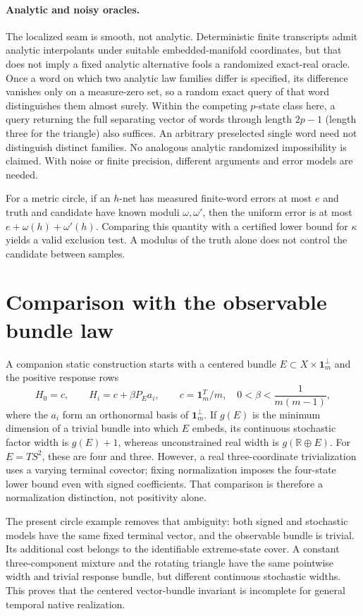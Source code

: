 \documentclass[11pt]{article}
\theoremstyle{definition}\newtheorem{definition}[theorem]{Definition}
\theoremstyle{remark}\newtheorem{remark}[theorem]{Remark}
\newcommand{\R}{\mathbb R}
\newcommand{\one}{\mathbf 1}
\begin{document}
\paragraph{Analytic and noisy oracles.}
The localized seam is smooth, not analytic. Deterministic finite transcripts admit analytic interpolants under suitable embedded-manifold coordinates, but that does not imply a fixed analytic alternative fools a randomized exact-real oracle. Once a word on which two analytic law families differ is specified, its difference vanishes only on a measure-zero set, so a random exact query of that word distinguishes them almost surely. Within the competing $p$-state class here, a query returning the full separating vector of words through length $2p-1$ (length three for the triangle) also suffices. An arbitrary preselected single word need not distinguish distinct families. No analogous analytic randomized impossibility is claimed. With noise or finite precision, different arguments and error models are needed.

For a metric circle, if an $h$-net has measured finite-word errors at most $e$ and truth and candidate have known moduli $\omega,\omega'$, then the uniform error is at most $e+\omega(h)+\omega'(h)$. Comparing this quantity with a certified lower bound for $\kappa$ yields a valid exclusion test. A modulus of the truth alone does not control the candidate between samples.

\section{Comparison with the observable bundle law}
A companion static construction starts with a centered bundle $E\subset X\times\one_m^\perp$ and the positive response rows
\[
 H_0=c,\qquad H_i=c+\beta P_Ea_i,\qquad
 c=\one_m^T/m,\quad 0<\beta<\frac1{m(m-1)},
\]
where the $a_i$ form an orthonormal basis of $\one_m^\perp$. If $g(E)$ is the minimum dimension of a trivial bundle into which $E$ embeds, its continuous stochastic factor width is $g(E)+1$, whereas unconstrained real width is $g(\R\oplus E)$. For $E=TS^2$, these are four and three. However, a real three-coordinate trivialization uses a varying terminal covector; fixing normalization imposes the four-state lower bound even with signed coefficients. That comparison is therefore a normalization distinction, not positivity alone.

The present circle example removes that ambiguity: both signed and stochastic models have the same fixed terminal vector, and the observable bundle is trivial. Its additional cost belongs to the identifiable extreme-state cover. A constant three-component mixture and the rotating triangle have the same pointwise width and trivial response bundle, but different continuous stochastic widths. This proves that the centered vector-bundle invariant is incomplete for general temporal native realization.
\end{document}
